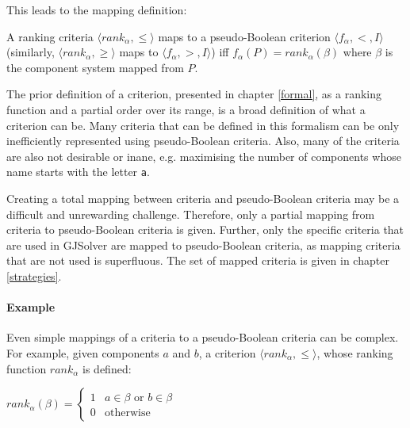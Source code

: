 This leads to the mapping definition:
\begin{defs}
A ranking criteria $\langle rank_{\alpha},\leq \rangle$ maps to a pseudo-Boolean criterion  $\langle f_{\alpha}, < , I \rangle$ 
(similarly, $\langle rank_{\alpha},\geq \rangle $ maps to $ \langle f_{\alpha}, > , I \rangle$) iff
$f_{\alpha}(P) = rank_{\alpha}(\beta)$ where $\beta$ is the component system mapped from $P$. 
\end{defs}

The prior definition of a criterion, presented in chapter \ref{formal}, as a ranking function and a partial order over its range, is a broad definition of what a criterion can be.
Many criteria that can be defined in this formalism can be only inefficiently represented using pseudo-Boolean criteria.
Also, many of the  criteria are also not desirable or inane, e.g. maximising the number of components whose name starts with the letter \texttt{a}.

Creating a total mapping between criteria and pseudo-Boolean criteria may be a difficult and unrewarding challenge.
Therefore, only a partial mapping from criteria to pseudo-Boolean criteria is given.
Further, only the specific criteria that are used in GJSolver are mapped to pseudo-Boolean criteria,
as mapping criteria that are not used is superfluous. 
The set of mapped criteria is given in chapter \ref{strategies}.

\paragraph{Example}
Even simple mappings of a criteria to a pseudo-Boolean criteria can be complex.
For example, given components $a$ and $b$, a criterion $\langle rank_{\alpha},\leq \rangle$, whose ranking function $rank_{\alpha}$ is defined:

$rank_{\alpha}(\beta) = \begin{cases} 1 & a \in \beta \text{ or } b \in \beta\\ 0 & \text{otherwise} \end{cases}$

